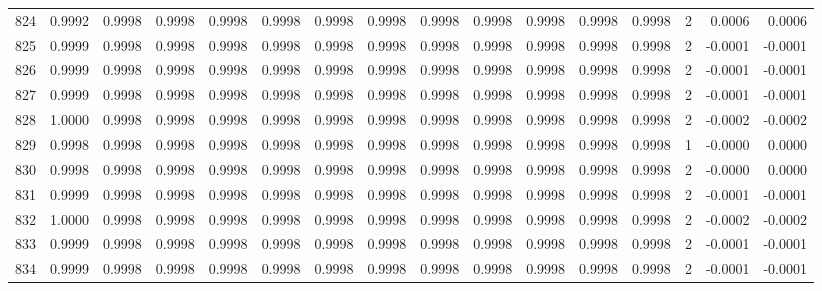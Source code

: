 \begin{tabular}{lrrrrrrrrrrrrrrr}
824 &      0.9992 &  0.9998 &  0.9998 &  0.9998 &  0.9998 &  0.9998 &  0.9998 &  0.9998 &  0.9998 &  0.9998 &   0.9998 &     0.9998 &      2 &                    0.0006 &                     0.0006 \\
825 &      0.9999 &  0.9998 &  0.9998 &  0.9998 &  0.9998 &  0.9998 &  0.9998 &  0.9998 &  0.9998 &  0.9998 &   0.9998 &     0.9998 &      2 &                   -0.0001 &                    -0.0001 \\
826 &      0.9999 &  0.9998 &  0.9998 &  0.9998 &  0.9998 &  0.9998 &  0.9998 &  0.9998 &  0.9998 &  0.9998 &   0.9998 &     0.9998 &      2 &                   -0.0001 &                    -0.0001 \\
827 &      0.9999 &  0.9998 &  0.9998 &  0.9998 &  0.9998 &  0.9998 &  0.9998 &  0.9998 &  0.9998 &  0.9998 &   0.9998 &     0.9998 &      2 &                   -0.0001 &                    -0.0001 \\
828 &      1.0000 &  0.9998 &  0.9998 &  0.9998 &  0.9998 &  0.9998 &  0.9998 &  0.9998 &  0.9998 &  0.9998 &   0.9998 &     0.9998 &      2 &                   -0.0002 &                    -0.0002 \\
829 &      0.9998 &  0.9998 &  0.9998 &  0.9998 &  0.9998 &  0.9998 &  0.9998 &  0.9998 &  0.9998 &  0.9998 &   0.9998 &     0.9998 &      1 &                   -0.0000 &                     0.0000 \\
830 &      0.9998 &  0.9998 &  0.9998 &  0.9998 &  0.9998 &  0.9998 &  0.9998 &  0.9998 &  0.9998 &  0.9998 &   0.9998 &     0.9998 &      2 &                   -0.0000 &                     0.0000 \\
831 &      0.9999 &  0.9998 &  0.9998 &  0.9998 &  0.9998 &  0.9998 &  0.9998 &  0.9998 &  0.9998 &  0.9998 &   0.9998 &     0.9998 &      2 &                   -0.0001 &                    -0.0001 \\
832 &      1.0000 &  0.9998 &  0.9998 &  0.9998 &  0.9998 &  0.9998 &  0.9998 &  0.9998 &  0.9998 &  0.9998 &   0.9998 &     0.9998 &      2 &                   -0.0002 &                    -0.0002 \\
833 &      0.9999 &  0.9998 &  0.9998 &  0.9998 &  0.9998 &  0.9998 &  0.9998 &  0.9998 &  0.9998 &  0.9998 &   0.9998 &     0.9998 &      2 &                   -0.0001 &                    -0.0001 \\
834 &      0.9999 &  0.9998 &  0.9998 &  0.9998 &  0.9998 &  0.9998 &  0.9998 &  0.9998 &  0.9998 &  0.9998 &   0.9998 &     0.9998 &      2 &                   -0.0001 &                    -0.0001 \\

\end{tabular}
